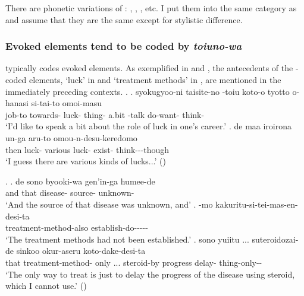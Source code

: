 There are phonetic variations of :
, , , etc.
I put them into the same category as  and assume that they are the same
except for stylistic difference.


\subsubsection{Evoked elements tend to be coded by \textit{toiuno-wa}}

 typically codes evoked elements.
As exemplified in \Next and \NNext,
the antecedents of the -coded elements,
 `luck' in \Next and  `treatment methods' in \NNext,
are mentioned in the immediately preceding contexts.
%
\ex.
 \ag. syokugyoo-ni taisite-no -toiu koto-o tyotto o-hanasi si-tai-to omoi-masu \\
		job-to towards- luck- thing- a.bit -talk do-want- think- \\
		`I'd like to speak a bit about the role of luck in one's career.'
 \bg. de  maa iroirona un-ga aru-to omou-n-desu-keredomo \\
 	then luck-  various luck- exist- think---though \\
	`I guess there are various kinds of lucks...'
	\hfill{()}

\ex. \ag. de sono byooki-wa gen'in-ga humee-de \\
	and that disease- source- unknown- \\
	`And the source of that disease was unknown, and'
	\bg. -mo kakuritu-si-tei-mas-en-desi-ta \\
		treatment-method-also establish-do----- \\
		`The treatment methods had not been established.'
	\bg. sono  yuiitu ... suteroidozai-de sinkoo okur-aseru koto-dake-desi-ta \\
		that treatment-method- only ... steroid-by progress delay- thing-only-- \\
		`The only way to treat is just to delay the progress of the disease using steroid, which I cannot use.' \hfill{()}

